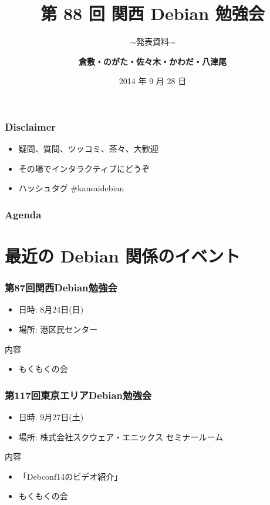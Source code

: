 \documentclass[cjk,dvipdfmx,10pt,compress,%
hyperref={bookmarks=true,bookmarksnumbered=true,bookmarksopen=false,%
colorlinks=false,%
pdftitle={第 88 回 関西 Debian 勉強会},%
pdfauthor={倉敷・のがた・佐々木・かわだ・八津尾},%
pdfsubject={資料},%
}]{beamer}
\title{第 88 回 関西 Debian 勉強会}
\subtitle{$\sim$発表資料$\sim$}
\author[かわだ てつたろう]{{\large\bf 倉敷・のがた・佐々木・かわだ・八津尾}}
\institute[Debian JP]{{\normalsize\tt 関西 Debian 勉強会}}
\date{{\small 2014 年 9 月 28 日}}
\begin{document}
\settitleslide
\begin{frame}
\titlepage
\end{frame}
\setdefaultslide

\begin{frame}[fragile]
  \frametitle{Disclaimer}
  \begin{itemize}
  \item 疑問、質問、ツッコミ、茶々、\alert{大歓迎}
  \item その場でインタラクティブにどうぞ
  \item ハッシュタグ \#kansaidebian
\end{itemize}
\end{frame}

\begin{frame}[fragile]
\frametitle{Agenda}

\tableofcontents

\end{frame}

\section{最近の Debian 関係のイベント}


\begin{frame}[fragile]
  \frametitle{第87回関西Debian勉強会}
  \begin{itemize}
  \item 日時: 8月24日(日)
  \item 場所: 港区民センター
  \end{itemize}
  \begin{block}{内容}
    \begin{itemize}
    \item もくもくの会
    \end{itemize}
  \end{block}
\end{frame}

\begin{frame}[fragile]
  \frametitle{第117回東京エリアDebian勉強会}
  \begin{itemize}
  \item 日時: 9月27日(土)
  \item 場所: 株式会社スクウェア・エニックス セミナールーム
  \end{itemize}
  \begin{block}{内容}
    \begin{itemize}
    \item 「Debconf14のビデオ紹介」
    \item もくもくの会
    \end{itemize}
  \end{block}
\end{frame}
\end{document}
